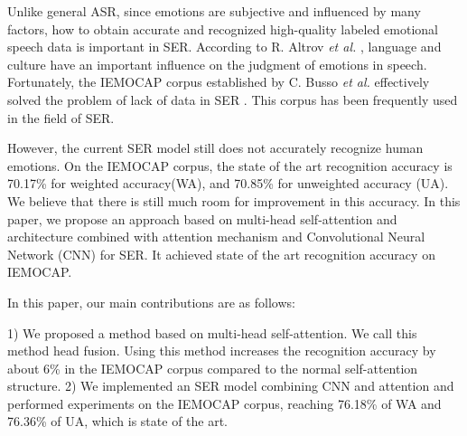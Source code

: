 \documentclass[10pt, conference, compsocconf]{IEEEtran}
\begin{document}
Unlike general ASR, since emotions are subjective and influenced by many factors, how to obtain accurate and recognized high-quality labeled emotional speech data is important in SER. According to R. Altrov \emph{et al.} \cite{altrov2015influence}, language and culture have an important influence on the judgment of emotions in speech. Fortunately, the IEMOCAP corpus established by C. Busso \emph{et al.} effectively solved the problem of lack of data in SER \cite{busso2008iemocap}. This corpus has been frequently used in the field of SER.

However, the current SER model still does not accurately recognize human emotions. On the IEMOCAP corpus, the state of the art recognition accuracy is 70.17\% for weighted accuracy(WA), and 70.85\% for unweighted accuracy (UA)\cite{tarantino2019self}. We believe that there is still much room for improvement in this accuracy.
In this paper, we propose an approach based on multi-head self-attention and architecture combined with attention mechanism and Convolutional Neural Network (CNN) for SER. It achieved state of the art recognition accuracy on IEMOCAP.

In this paper, our main contributions are as follows:

1) We proposed a method based on multi-head self-attention. We call this method head fusion. Using this method increases the recognition accuracy by about 6\% in the IEMOCAP corpus compared to the normal self-attention structure.
2) We implemented an SER model combining CNN and attention and performed experiments on the IEMOCAP corpus, reaching 76.18\% of WA and 76.36\% of UA, which is state of the art.


%
%

\end{document}
